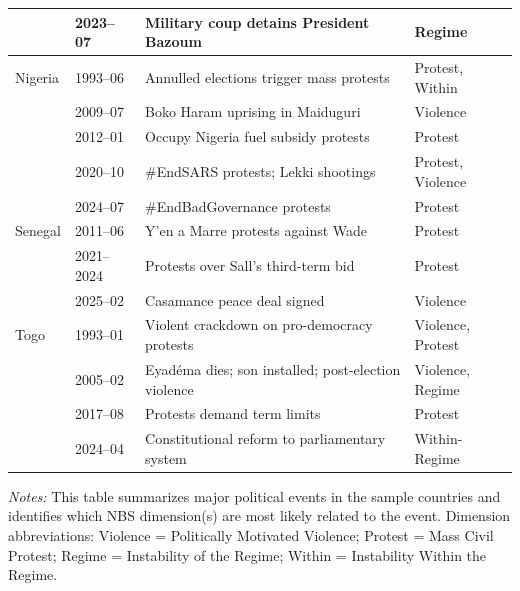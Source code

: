 \begin{table}[htbp]
\begin{tabular}{p{2.5cm} p{1.5cm} p{7.5cm} L{3cm}}
       & 2023--07 & Military coup detains President Bazoum & Regime \\
\midrule
Nigeria & 1993--06 & Annulled elections trigger mass protests & Protest, Within \\
        & 2009--07 & Boko Haram uprising in Maiduguri & Violence \\
        & 2012--01 & Occupy Nigeria fuel subsidy protests & Protest \\
        & 2020--10 & \#EndSARS protests; Lekki shootings & Protest, Violence \\
        & 2024--07 & \#EndBadGovernance protests & Protest \\
\midrule
Senegal & 2011--06 & Y'en a Marre protests against Wade & Protest \\
         & 2021--2024 & Protests over Sall's third-term bid & Protest \\
         & 2025--02 & Casamance peace deal signed & Violence \\
\midrule
Togo & 1993--01 & Violent crackdown on pro-democracy protests & Violence, Protest \\
     & 2005--02 & Eyadéma dies; son installed; post-election violence & Violence, Regime \\
     & 2017--08 & Protests demand term limits & Protest \\
     & 2024--04 & Constitutional reform to parliamentary system & Within-Regime \\
\bottomrule
\end{tabular}
\label{tab:instability_events_detailed}
\vspace{0.5em}
\begin{minipage}{\textwidth}
{\footnotesize \flushleft \textit{Notes:} This table summarizes major political events in the sample countries and identifies which NBS dimension(s) are most likely related to the event. Dimension abbreviations: Violence = Politically Motivated Violence; Protest = Mass Civil Protest; Regime = Instability of the Regime; Within = Instability Within the Regime.}
\end{minipage}
\end{table}


